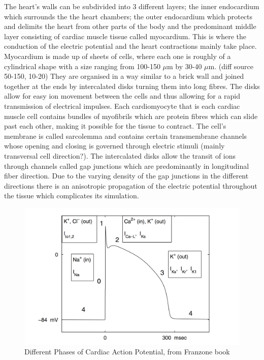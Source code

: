 \documentclass[../draft_1.tex]{subfiles}
\begin{document}
The heart's walls can be subdivided into 3 different layers; the inner endocardium which surrounds the the heart chambers; the outer endocardium which protects and delimits the heart from other parts of the body and the predominant middle layer consisting of cardiac muscle tissue called myocardium. This is where the conduction of the electric potential and the heart contractions mainly take place. Myocardium is made up of sheets of cells, where each one is roughly of a cylindrical shape with a size ranging from 100-150 $\mu$m by 30-40 $\mu$m. (diff source 50-150, 10-20) They are organised in a way similar to a brick wall and joined together at the ends by intercalated disks turning them into long fibres. The disks allow for easy ion movement between the cells and thus allowing for a rapid transmission of electrical impulses. Each cardiomyocyte that is each cardiac muscle cell contains bundles of myofibrils which are protein fibres which can slide past each other, making it possible for the tissue to contract. The cell's membrane is called sarcolemma and contains certain transmembrane channels whose opening and closing is governed through electric stimuli (mainly transversal cell direction?). The intercalated disks allow the transit of ions through channels called gap junctions which are predominantly in longitudinal fiber direction. Due to the varying density of the gap junctions in the different directions there is an anisotropic propagation of the electric potential throughout the tissue which complicates its simulation. 

\begin{figure}[ht!]
	\centering
	\includegraphics[scale=0.3]{images/cardiac_action_pot_franzone}
	\caption{Different Phases of Cardiac Action Potential, from Franzone book}
\end{figure}
\end{document}
